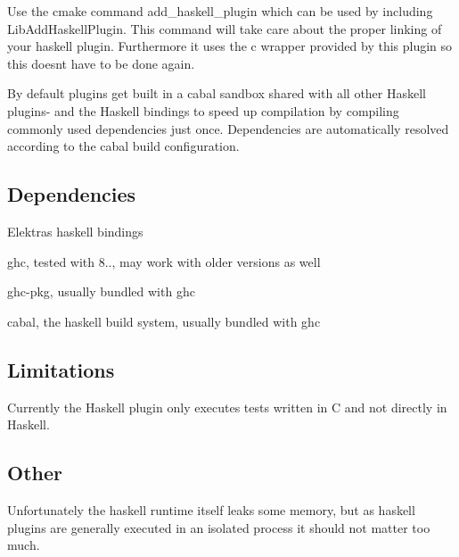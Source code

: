 Use the cmake command add\+\_\+haskell\+\_\+plugin which can be used by including Lib\+Add\+Haskell\+Plugin. This command will take care about the proper linking of your haskell plugin. Furthermore it uses the c wrapper provided by this plugin so this doesn\textquotesingle{}t have to be done again.

By default plugins get built in a cabal sandbox shared with all other Haskell plugins-\/ and the Haskell bindings to speed up compilation by compiling commonly used dependencies just once. Dependencies are automatically resolved according to the cabal build configuration.

\subsection*{Dependencies}


\begin{DoxyItemize}
\item Elektra\textquotesingle{}s haskell bindings
\item ghc, tested with 8.., may work with older versions as well
\item ghc-\/pkg, usually bundled with ghc
\item cabal, the haskell build system, usually bundled with ghc
\end{DoxyItemize}

\subsection*{Limitations}

Currently the Haskell plugin only executes tests written in C and not directly in Haskell.

\subsection*{Other}

Unfortunately the haskell runtime itself leaks some memory, but as haskell plugins are generally executed in an isolated process it should not matter too much. 